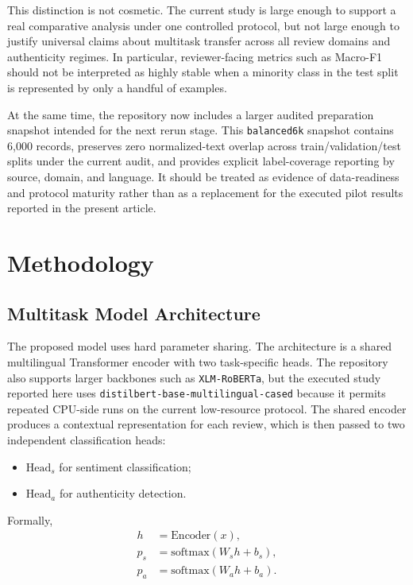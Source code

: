 \documentclass[12pt,a4paper]{article}
\begin{document}
This distinction is not cosmetic. The current study is large enough to support a real comparative analysis under one controlled protocol, but not large enough to justify universal claims about multitask transfer across all review domains and authenticity regimes. In particular, reviewer-facing metrics such as Macro-F1 should not be interpreted as highly stable when a minority class in the test split is represented by only a handful of examples.

At the same time, the repository now includes a larger audited preparation snapshot intended for the next rerun stage. This \texttt{balanced6k} snapshot contains 6{,}000 records, preserves zero normalized-text overlap across train/validation/test splits under the current audit, and provides explicit label-coverage reporting by source, domain, and language. It should be treated as evidence of data-readiness and protocol maturity rather than as a replacement for the executed pilot results reported in the present article.

\section{Methodology}

\subsection{Multitask Model Architecture}

The proposed model uses hard parameter sharing. The architecture is a shared multilingual Transformer encoder with two task-specific heads. The repository also supports larger backbones such as \texttt{XLM-RoBERTa}, but the executed study reported here uses \texttt{distilbert-base-multilingual-cased} because it permits repeated CPU-side runs on the current low-resource protocol. The shared encoder produces a contextual representation for each review, which is then passed to two independent classification heads:

\begin{itemize}[leftmargin=1.5cm]
  \item $\text{Head}_s$ for sentiment classification;
  \item $\text{Head}_a$ for authenticity detection.
\end{itemize}

Formally,
\begin{align}
h &= \text{Encoder}(x), \\
p_s &= \text{softmax}(W_s h + b_s), \\
p_a &= \text{softmax}(W_a h + b_a).
\end{align}
\end{document}
